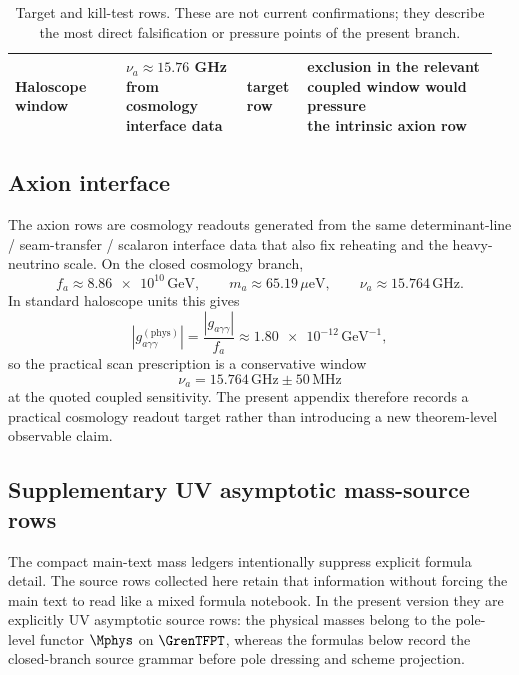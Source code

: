 \begin{table}[H]
{\begin{tabular}{@{}>{\raggedright\arraybackslash}p{0.22\linewidth}>{\raggedright\arraybackslash}p{0.24\linewidth}>{\raggedright\arraybackslash}p{0.12\linewidth}>{\raggedright\arraybackslash}p{0.38\linewidth}@{}}
Haloscope window & \makecell[l]{$\nu_a\approx\num{15.76}$ GHz\\from cosmology interface data} & \makecell[l]{target\\row} & \makecell[l]{exclusion in the relevant\\coupled window would pressure\\the intrinsic axion row} \\
\bottomrule
\end{tabular}}
\caption{Target and kill-test rows. These are not current confirmations; they describe the most direct falsification or pressure points of the present branch.}
\label{tab:kill-tests}
\end{table}

\subsection{Axion interface}

The axion rows are cosmology readouts generated from the same determinant-line / seam-transfer /
scalaron interface data that also fix reheating and the heavy-neutrino scale. On the closed
cosmology branch,
\[
f_a\approx \num{8.86e10}\,\mathrm{GeV},
\qquad
m_a\approx \num{65.19}\,\mu\mathrm{eV},
\qquad
\nu_a\approx \num{15.764}\,\mathrm{GHz}.
\]
In standard haloscope units this gives
\[
\left|g_{a\gamma\gamma}^{(\mathrm{phys})}\right|
=
\frac{|g_{a\gamma\gamma}|}{f_a}
\approx
\num{1.80e-12}\,\mathrm{GeV}^{-1},
\]
so the practical scan prescription is a conservative window
\[
\nu_a=\num{15.764}\,\mathrm{GHz}\pm \num{50}\,\mathrm{MHz}
\]
at the quoted coupled sensitivity. The present appendix therefore records a practical cosmology
readout target rather than introducing a new theorem-level observable claim.

\subsection{Supplementary UV asymptotic mass-source rows}

The compact main-text mass ledgers intentionally suppress explicit formula detail. The source rows
collected here retain that information without forcing the main text to read like a mixed formula
notebook. In the present version they are explicitly UV asymptotic source rows: the physical masses
belong to the pole-level functor $\Mphys$ on $\GrenTFPT$, whereas the formulas below record the
closed-branch source grammar before pole dressing and scheme projection.

